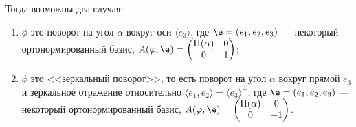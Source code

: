 \begin{enumerate}
Тогда возможны два случая:
\begin{enumerate}
\item $\phi$ это поворот на угол $\alpha$ вокруг оси $\langle e_3 \rangle$, где $\e = (e_1, e_2, e_3)$ --- некоторый ортонормированный базис, $A(\phi, \e) = \begin{pmatrix}
\Pi(\alpha) & 0 \\
0 & 1
\end{pmatrix}$;
\item $\phi$ это <<зеркальный поворот>>, то есть поворот на угол $\alpha$ вокруг прямой $e_3$ и зеркальное отражение относительно $\langle e_1, e_2\rangle = \langle e_3\rangle^\perp$, где $\e = (e_1, e_2, e_3)$ --- некоторый ортонормированный базис, $A(\phi, \e) = \begin{pmatrix}
\Pi(\alpha) & 0 \\
0 & -1
\end{pmatrix}$.
\end{enumerate}


\end{enumerate}



